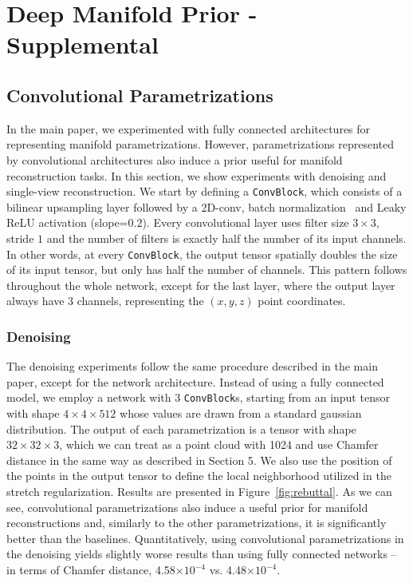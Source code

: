 \chapter{Deep Manifold Prior - Supplemental}

\section{Convolutional Parametrizations}

In the main paper, we experimented with fully connected architectures
for representing manifold parametrizations.
However, parametrizations represented by convolutional architectures
also induce a prior useful for manifold reconstruction tasks.
In this section, we show experiments with denoising and single-view
reconstruction.
We start by defining a \texttt{ConvBlock}, which consists of a bilinear upsampling layer followed by a 2D-conv, batch normalization~\cite{batchnorm} and Leaky ReLU activation (slope=$0.2$).
Every convolutional layer uses filter size $3 \times 3$, stride $1$ and the number of filters is exactly half the number of its input channels.
In other words, at every \texttt{ConvBlock}, the output tensor spatially doubles the size of its input tensor, but only has half the number of channels.
This pattern follows throughout the whole network, except for the last layer, where the output layer always have 3 channels, representing the $(x,y,z)$ point coordinates.

\subsection{Denoising}

The denoising experiments follow the same procedure described in the
main paper, except for the network architecture.
Instead of using a fully connected model, we employ a network with 3 \texttt{ConvBlock}s,
starting from an input tensor with shape $4\times4\times512$ whose values are drawn from
a standard gaussian distribution.
The output of each parametrization is a tensor with shape $32\times32\times3$, which we can treat
as a point cloud with 1024 and use Chamfer distance in the same way as described in Section 5.
We also use the position of the points in the output tensor to define the local neighborhood
utilized in the stretch regularization.
Results are presented in Figure~\ref{fig:rebuttal}.
As we can see, convolutional parametrizations also induce a useful prior for manifold
reconstructions and, similarly to the other parametrizations, it is significantly
better than the baselines.
Quantitatively, using convolutional parametrizations in the denoising yields slightly
worse results than using fully connected networks -- in terms of Chamfer distance, 4.58$\times10^{-4}$ vs. 4.48$\times10^{-4}$.


